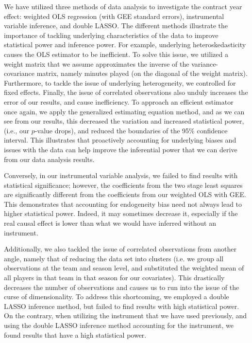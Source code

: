 \documentclass[12pt]{article}
\begin{document}
	We have utilized three methods of data analysis to investigate the contract year effect: weighted OLS regression (with GEE standard errors), instrumental variable inference, and double LASSO. The different methods illustrate the importance of tackling underlying characteristics of the data to improve statistical power and inference power. For example, underlying heteroskedasticity causes the OLS estimator to be inefficient. To solve this issue, we utilized a weight matrix that we assume approximates the inverse of the variance-covariance matrix, namely minutes played (on the diagonal of the weight matrix). Furthermore, to tackle the issue of underlying heterogeneity, we controlled for fixed effects. Finally, the issue of correlated observations also unduly increases the error of our results, and cause inefficiency. To approach an efficient estimator once again, we apply the generalized estimating equation method, and as we can see from our results, this decreased the variation and increased statistical power, (i.e., our $p$-value drops), and reduced the boundaries of the 95\% confidence interval. This illustrates that proactively accounting for underlying biases and issues with the data can help improve the inferential power that we can derive from our data analysis results.
	
	Conversely, in our instrumental variable analysis, we failed to find results with statistical significance; however, the coefficients from the two stage least squares are significantly different from the coefficients from our weighted OLS with GEE. This demonstrates that accounting for endogeneity bias need not always lead to higher statistical power. Indeed, it may sometimes decrease it, especially if the real causal effect is lower than what we would have inferred without an instrument.
	
	Additionally, we also tackled the issue of correlated observations from another angle, namely that of reducing the data set into clusters (i.e. we group all observations at the team and season level, and substituted the weighted mean of all players in that team in that season for our covariates). This drastically decreases the number of observations and causes us to run into the issue of the curse of dimensionality. To address this shortcoming, we employed a double LASSO inference method, but failed to find results with high statistical power. On the contrary, when utilizing the instrument that we have used previously, and using the double LASSO inference method accounting for the instrument, we found results that have a high statistical power.
	
\end{document}
